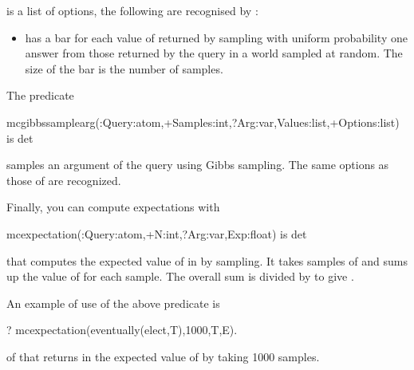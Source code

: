 \documentclass[letterpaper,10pt,english]{sphinxmanual}
\begin{document}
 is a list of options, the following are recognised by :
\begin{itemize}
\item {} 
  has a bar for each value of  returned by sampling with uniform probability one answer from those returned by the query in a world sampled at random. The size of the bar is the number of samples.

\end{itemize}

The predicate

\begin{sphinxVerbatim}[commandchars=\\\{\}]
mc\PYGZus{}gibbs\PYGZus{}sample\PYGZus{}arg(:Query:atom,+Samples:int,?Arg:var,\PYGZhy{}Values:list,+Options:list) is det
\end{sphinxVerbatim}

samples an argument of the query using Gibbs sampling.
The same options as those of  are recognized.

Finally, you can compute expectations with

\begin{sphinxVerbatim}[commandchars=\\\{\}]
mc\PYGZus{}expectation(:Query:atom,+N:int,?Arg:var,\PYGZhy{}Exp:float) is det
\end{sphinxVerbatim}

that computes the expected value of  in  by sampling.
It takes  samples of  and sums up the value of  for each sample.
The overall sum is divided by  to give .

An example of use of the above predicate is

\begin{sphinxVerbatim}[commandchars=\\\{\}]
?\PYGZhy{} mc\PYGZus{}expectation(eventually(elect,T),1000,T,E).
\end{sphinxVerbatim}

of  that returns in  the expected value
of  by taking 1000 samples.
\end{document}
